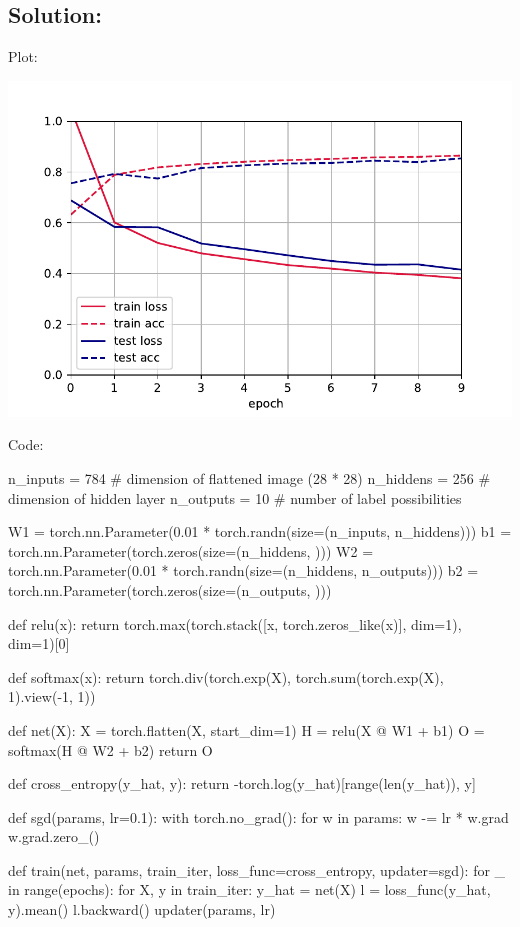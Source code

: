 \documentclass[submit]{harvardml}
\begin{document}
\newpage
\subsection*{Solution:}
Plot:

\includegraphics[width=\linewidth]{final_plot}

\newpage
Code:

\begin{python}
n_inputs = 784 # dimension of flattened image (28 * 28)
n_hiddens = 256 # dimension of hidden layer
n_outputs = 10 # number of label possibilities

W1 = torch.nn.Parameter(0.01 * torch.randn(size=(n_inputs, n_hiddens)))
b1 = torch.nn.Parameter(torch.zeros(size=(n_hiddens, )))
W2 = torch.nn.Parameter(0.01 * torch.randn(size=(n_hiddens, n_outputs)))
b2 = torch.nn.Parameter(torch.zeros(size=(n_outputs, )))

def relu(x):
    return torch.max(torch.stack([x, torch.zeros_like(x)], dim=1), dim=1)[0]

def softmax(x):
    return torch.div(torch.exp(X), torch.sum(torch.exp(X), 1).view(-1, 1))

def net(X):
    X = torch.flatten(X, start_dim=1)
    H = relu(X @ W1 + b1)
    O = softmax(H @ W2 + b2)
    return O

def cross_entropy(y_hat, y):
    return -torch.log(y_hat)[range(len(y_hat)), y]

def sgd(params, lr=0.1):
    with torch.no_grad():
        for w in params:
            w -= lr * w.grad
            w.grad.zero_()

def train(net, params, train_iter, loss_func=cross_entropy, updater=sgd):
    for _ in range(epochs):
        for X, y in train_iter:
            y_hat = net(X)
            l = loss_func(y_hat, y).mean()
            l.backward()
            updater(params, lr)

\end{python}
\end{document}
